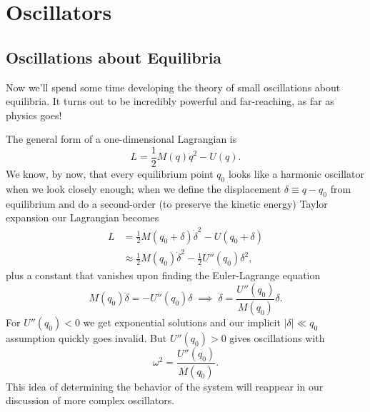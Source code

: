\documentclass[../p111main.tex]{subfiles}
\begin{document}
\chapter{Oscillators}
\section{Oscillations about Equilibria}
Now we'll spend some time developing the theory of small oscillations about equilibria.
It turns out to be incredibly powerful and far-reaching, as far as physics goes!

The general form of a one-dimensional Lagrangian is
\[ L = \frac{1}{2} M(q) \dot q^2 - U(q). \]
We know, by now, that every equilibrium point $q_0$ looks like a harmonic oscillator when we look closely enough; when we define the displacement $\delta \equiv q - q_0$ from equilibrium and do a second-order (to preserve the kinetic energy) Taylor expansion our Lagrangian becomes
\begin{align*}
    L &= \frac{1}{2} M(q_0 + \delta) \dot \delta^2 - U(q_0 + \delta) \\
    &\approx \frac{1}{2} M(q_0) \dot \delta^2 - \frac{1}{2}U''(q_0) \delta^2,
\end{align*}
plus a constant that vanishes upon finding the Euler-Lagrange equation
\[ M(q_0) \ddot \delta = -U''(q_0) \delta \;\implies\; \ddot \delta = \frac{U''(q_0)}{M(q_0)} \delta. \]
For $U''(q_0) < 0$ we get exponential solutions and our implicit $|\delta| \ll q_0$ assumption quickly goes invalid.
But $U''(q_0) > 0$ gives oscillations with
\[ \omega^2 = \frac{U''(q_0)}{M(q_0)}. \]
This idea of determining the behavior of the system will reappear in our discussion of more complex oscillators.
\end{document}
